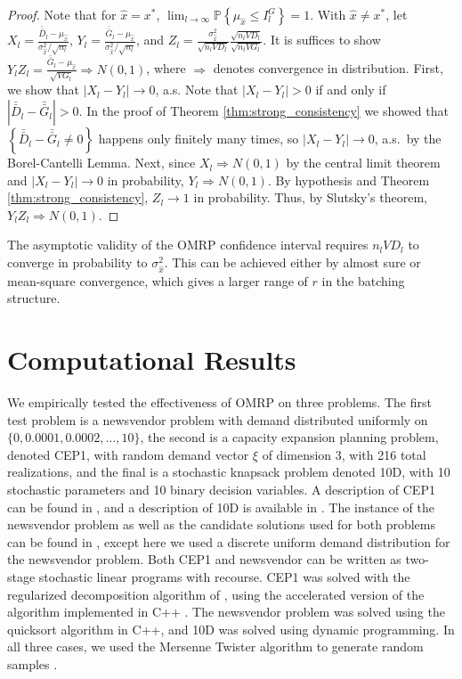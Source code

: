 \documentclass{article}
\newcommand{\p}[1]{\mathbb{P} \left\{ #1 \right\}}
\newcommand{\x}{x} %
\newcommand{\xh}{{\hat{\x}}}
\newcommand{\xs}{\x^*}
\newcommand{\xit}{\xi}  %
\newcommand{\gb}{\bar{G}}
\newcommand{\gbb}{\bar{\gb}}
\newcommand{\db}{\bar{D}}
\newcommand{\dbb}{\bar{\db}}
\begin{document}
\begin{proof}
	Note that for $\xh = \xs$, $\lim_{l\rightarrow\infty} \p{\mu_\xh \leq I^G_l} = 1$.  
        With $\xh \neq \xs$, let $X_l = \frac{\dbb_l - \mu_\xh}{\sigma^2_\xh/\sqrt{n_l}}$, $Y_l = \frac{\gbb_l - \mu_\xh}{\sigma^2_\xh/\sqrt{n_l}}$, and $Z_l = \frac{\sigma^2_\xh}{\sqrt{n_lVD_l}} \frac{\sqrt{n_lVD_l}}{\sqrt{n_lVG_l}}$.  
        It is suffices to show $Y_lZ_l = \frac{\gbb_l - \mu_\xh}{\sqrt{VG_l}} \Rightarrow N(0,1)$, where $\Rightarrow$ denotes convergence in distribution.  
        First, we show that $|X_l - Y_l| \rightarrow 0$, a.s.  Note that $|X_l - Y_l| > 0$ if and only if $|\dbb_l - \gbb_l| > 0$.  
        In the proof of Theorem \ref{thm:strong_consistency} we showed that $\left\{ \dbb_l - \gbb_l \neq 0 \right\}$ happens only finitely many times, so $|X_l - Y_l| \rightarrow 0$, a.s.\ by the Borel-Cantelli Lemma. 
        Next, since $X_l \Rightarrow N(0,1)$  by the central limit theorem and $|X_l - Y_l| \rightarrow 0$ in probability, $Y_l \Rightarrow N(0,1)$.  
        By hypothesis and Theorem \ref{thm:strong_consistency}, $Z_l \rightarrow 1$ in probability.  
        Thus, by Slutsky's theorem, $Y_lZ_l \Rightarrow N(0,1)$.
\end{proof}

The asymptotic validity of the OMRP confidence interval requires $n_l VD_l$ to converge in probability to $\sigma^{2}_{\xh}$. 
This can be achieved either by almost sure or mean-square convergence, which gives a larger range of $r$ in the batching structure.

\section{Computational Results}
\label{sec:comp}

We empirically tested the effectiveness of OMRP on three problems. 
The first test problem is a newsvendor problem with demand distributed uniformly on $\{0, 0.0001, 0.0002, \dots, 10\}$, the second is a capacity expansion planning problem, denoted CEP1, with random demand vector $\xit$ of dimension 3, with 216 total realizations, and the final is a stochastic knapsack problem denoted 10D, with 10 stochastic parameters and 10 binary decision variables.  
A description of CEP1 can be found in \cite{higle1996}, and a description of 10D is available in \cite{kleywegt2002sample}. 
The instance of the newsvendor problem as well as the candidate solutions used for both problems can be found in \cite{Bayraksan2006}, except here we used a discrete uniform demand distribution for the newsvendor problem.  
Both CEP1 and newsvendor can be written as two-stage stochastic linear programs with recourse. 
CEP1 was solved with the regularized decomposition algorithm of \cite{ruszczynski1986regularized}, using the accelerated version of the algorithm implemented in C++ \cite{ruszczynski1997accelerating}. 
The newsvendor problem was solved using the quicksort algorithm in C++, and 10D was solved using dynamic programming.  
In all three cases, we used the Mersenne Twister algorithm to generate random samples \cite{wagner_twister_09}.
\end{document}
